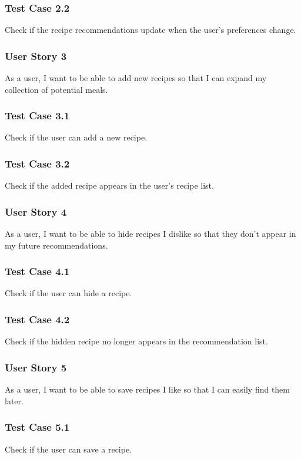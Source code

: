 \documentclass[11pt, letterpaper]{report}
\begin{document}
\subsubsection{Test Case 2.2}
Check if the recipe recommendations update when the user's preferences change.

\subsubsection{User Story 3}
As a user, I want to be able to add new recipes so that I can expand my collection of potential meals.

\subsubsection{Test Case 3.1}
Check if the user can add a new recipe.

\subsubsection{Test Case 3.2}
Check if the added recipe appears in the user's recipe list.

\subsubsection{User Story 4}
As a user, I want to be able to hide recipes I dislike so that they don't appear in my future recommendations.

\subsubsection{Test Case 4.1}
Check if the user can hide a recipe.

\subsubsection{Test Case 4.2}
Check if the hidden recipe no longer appears in the recommendation list.

\subsubsection{User Story 5}
As a user, I want to be able to save recipes I like so that I can easily find them later.

\subsubsection{Test Case 5.1}
Check if the user can save a recipe.
\end{document}

